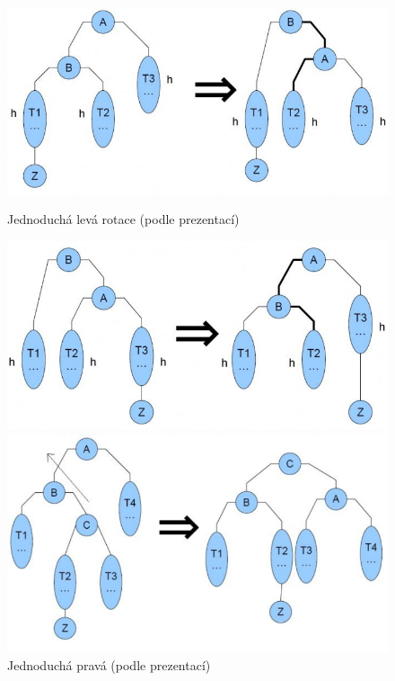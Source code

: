 \begin{figure}[htb]
    \begin{minipage}[b]{0.47\textwidth}
        \includegraphics[width=\textwidth]{images/jednoduchaleva.png}
        \caption{Jednoduchá levá rotace (podle prezentací)}
    \end{minipage}
    \hspace*{1em}
    \begin{minipage}[b]{0.47\textwidth}
        \includegraphics[width=\textwidth]{images/jednoduchaprava.png}
        \caption{Jednoduchá pravá (podle prezentací)}
    \end{minipage}
    \vspace{1em}
    \begin{minipage}[b]{0.47\textwidth}
        \includegraphics[width=\textwidth]{images/dvojnasobnaleva.png}

\end{minipage}
\end{figure}
